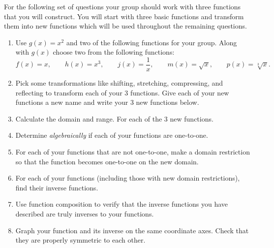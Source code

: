 For the following set of questions your group should work with three
functions that you will construct. You will start with three basic
functions and transform them into new functions which will be used
throughout the remaining questions.
\begin{enumerate}
\item Use $g(x)=x^2$ and two of the following functions for your
  group.  Along with $g(x)$ choose two from the following functions:
  $$f(x)=x, \quad \quad
  h(x)=x^3, \quad \quad
  j(x)=\frac{1}{x}, \quad \quad
  m(x)=\sqrt{x},  \quad \quad
  p(x)=\sqrt[3]{x}.$$

\item Pick some transformations like shifting, stretching,
  compressing, and reflecting to transform each of your 3
  functions. Give each of your new functions a new name and write your
  3 new functions below.  

  \vfill

\item Calculate the domain and range. For each of the 3 new functions.

  \vfill

\clearpage


\item Determine \emph{algebraically} if each of your functions are one-to-one.  

\vfill
\vfill


\item For each of your functions that are not one-to-one, make a
  domain restriction so that the function becomes one-to-one on the
  new domain.

\vfill

\clearpage


\item For each of your functions (including those with new domain restrictions), find their inverse functions.

\vfill

\item Use function composition to verify that the inverse functions you have described are truly inverses to your functions.

\vfill

\clearpage

\item Graph your function and its inverse on the same coordinate axes.  Check that they are properly symmetric to each other.


\end{enumerate}
